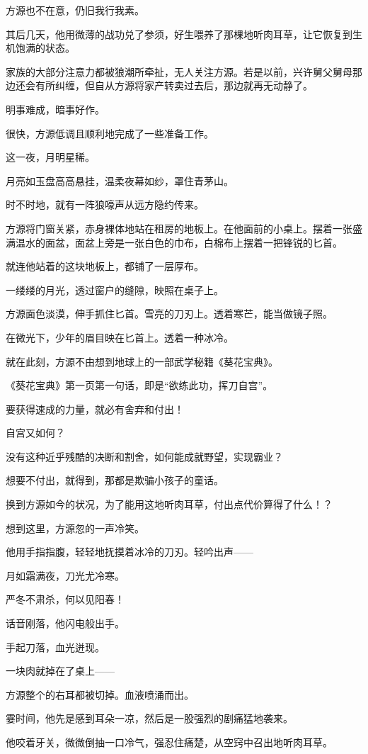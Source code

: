 \begin{this_body}
方源也不在意，仍旧我行我素。

其后几天，他用微薄的战功兑了参须，好生喂养了那棵地听肉耳草，让它恢复到生机饱满的状态。

家族的大部分注意力都被狼潮所牵扯，无人关注方源。若是以前，兴许舅父舅母那边还会有所纠缠，但自从方源将家产转卖过去后，那边就再无动静了。

明事难成，暗事好作。

很快，方源低调且顺利地完成了一些准备工作。

这一夜，月明星稀。

月亮如玉盘高高悬挂，温柔夜幕如纱，罩住青茅山。

时不时地，就有一阵狼嚎声从远方隐约传来。

方源将门窗关紧，赤身裸体地站在租房的地板上。在他面前的小桌上。摆着一张盛满温水的面盆，面盆上旁是一张白色的巾布，白棉布上摆着一把锋锐的匕首。

就连他站着的这块地板上，都铺了一层厚布。

一缕缕的月光，透过窗户的缝隙，映照在桌子上。

方源面色淡漠，伸手抓住匕首。雪亮的刀刃上。透着寒芒，能当做镜子照。

在微光下，少年的眉目映在匕首上。透着一种冰冷。

就在此刻，方源不由想到地球上的一部武学秘籍《葵花宝典》。

《葵花宝典》第一页第一句话，即是“欲练此功，挥刀自宫”。

要获得速成的力量，就必有舍弃和付出！

自宫又如何？

没有这种近乎残酷的决断和割舍，如何能成就野望，实现霸业？

想要不付出，就得到，那都是欺骗小孩子的童话。

换到方源如今的状况，为了能用这地听肉耳草，付出点代价算得了什么！？

想到这里，方源忽的一声冷笑。

他用手指指腹，轻轻地抚摸着冰冷的刀刃。轻吟出声——

月如霜满夜，刀光尤冷寒。

严冬不肃杀，何以见阳春！

话音刚落，他闪电般出手。

手起刀落，血光迸现。

一块肉就掉在了桌上——

方源整个的右耳都被切掉。血液喷涌而出。

霎时间，他先是感到耳朵一凉，然后是一股强烈的剧痛猛地袭来。

他咬着牙关，微微倒抽一口冷气，强忍住痛楚，从空窍中召出地听肉耳草。


\end{this_body}
